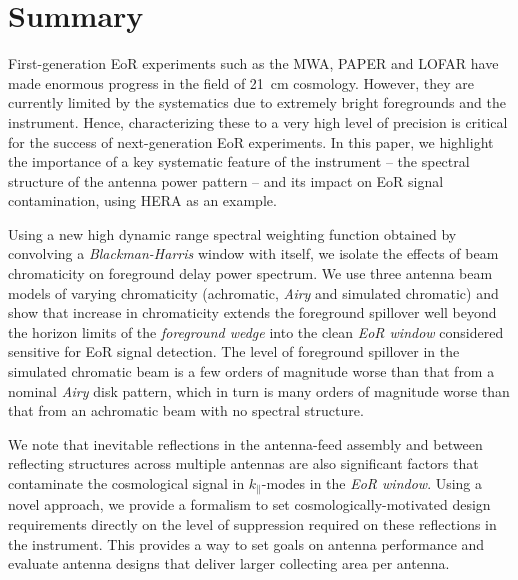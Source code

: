 \documentclass[preprint2,iop,numberedappendix,twocolappendix,appendixfloats]{emulateapj}
\begin{document}

\section{Summary}\label{sec:summary}

First-generation EoR experiments such as the MWA, PAPER and LOFAR have made enormous progress in the field of 21~cm cosmology. However, they are currently limited by the systematics due to extremely bright foregrounds and the instrument. Hence, characterizing these to a very high level of precision is critical for the success of next-generation EoR experiments. In this paper, we highlight the importance of a key systematic feature of the instrument -- the spectral structure of the antenna power pattern -- and its impact on EoR signal contamination, using HERA as an example. 

Using a new high dynamic range spectral weighting function obtained by convolving a {\it Blackman-Harris} window with itself, we isolate the effects of beam chromaticity on foreground delay power spectrum. We use three antenna beam models of varying chromaticity (achromatic, {\it Airy} and simulated chromatic) and show that increase in chromaticity extends the foreground spillover well beyond the horizon limits of the {\it foreground wedge} into the clean {\it EoR window} considered sensitive for EoR signal detection. The level of foreground spillover in the simulated chromatic beam is a few orders of magnitude worse than that from a nominal {\it Airy} disk pattern, which in turn is many orders of magnitude worse than that from an achromatic beam with no spectral structure. 

We note that inevitable reflections in the antenna-feed assembly and between reflecting structures across multiple antennas are also significant factors that contaminate the cosmological signal in $k_\parallel$-modes in the {\it EoR window}. Using a novel approach, we provide a formalism to set cosmologically-motivated design requirements directly on the level of suppression required on these reflections in the instrument. This provides a way to set goals on antenna performance and evaluate antenna designs that deliver larger collecting area per antenna.
\end{document}
